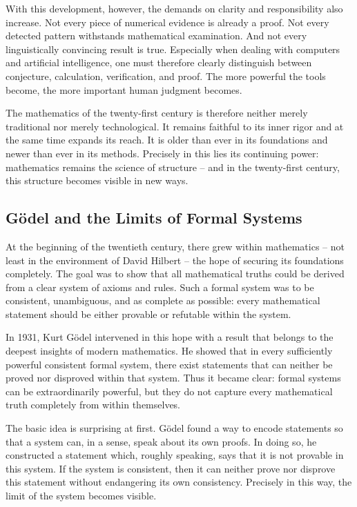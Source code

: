 With this development, however, the demands on clarity and responsibility also increase.
Not every piece of numerical evidence is already a proof.
Not every detected pattern withstands mathematical examination.
And not every linguistically convincing result is true.
Especially when dealing with computers and artificial intelligence,
one must therefore clearly distinguish between conjecture,
calculation,
verification,
and proof.
The more powerful the tools become,
the more important human judgment becomes.

The mathematics of the twenty-first century is therefore neither merely traditional nor merely technological.
It remains faithful to its inner rigor
and at the same time expands its reach.
It is older than ever in its foundations
and newer than ever in its methods.
Precisely in this lies its continuing power:
mathematics remains the science of structure --
and in the twenty-first century, this structure becomes visible in new ways.


\subsection{Gödel and the Limits of Formal Systems}

At the beginning of the twentieth century,
there grew within mathematics -- not least in the environment of David Hilbert --
the hope of securing its foundations completely.
The goal was to show
that all mathematical truths could be derived
from a clear system of axioms and rules.
Such a formal system was to be consistent,
unambiguous,
and as complete as possible:
every mathematical statement should be either provable or refutable within the system.

In 1931, Kurt Gödel intervened in this hope with a result
that belongs to the deepest insights of modern mathematics.
He showed that in every sufficiently powerful consistent formal system,
there exist statements
that can neither be proved nor disproved within that system.
Thus it became clear:
formal systems can be extraordinarily powerful,
but they do not capture every mathematical truth completely from within themselves.

The basic idea is surprising at first.
Gödel found a way to encode statements
so that a system can, in a sense, speak about its own proofs.
In doing so, he constructed a statement
which, roughly speaking, says that it is not provable in this system.
If the system is consistent,
then it can neither prove nor disprove this statement
without endangering its own consistency.
Precisely in this way, the limit of the system becomes visible.

